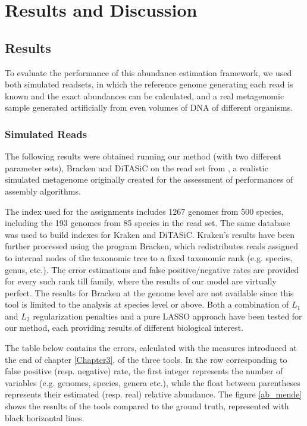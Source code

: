
\chapter{Results and Discussion}
\label{Chapter4}

\section{Results}

To evaluate the performance of this abundance estimation framework, we used both simulated readsets, in which the reference genome generating each read is known and the exact abundances can be calculated, and a real metagenomic sample generated artificially from even volumes of DNA of different organisms.

\subsection{Simulated Reads}
\label{mende_exp}

The following results were obtained running our method (with two different parameter sets), Bracken and DiTASiC on the read set from \cite{mende_assessment_2012}, a realistic simulated metagenome originally created for the assessment of performances of assembly algorithms.

The index used for the assignments includes 1267 genomes from 500 species, including the 193 genomes from 85 species in the read set. The same database was used to build indexes for Kraken and DiTASiC. Kraken's results have been further processed using the program Bracken, which redistributes reads assigned to internal nodes of the taxonomic tree to a fixed taxonomic rank (e.g. species, genus, etc.). The error estimations and false positive/negative rates are provided for every such rank till family, where the results of our model are virtually perfect. The results for Bracken at the genome level are not available since this tool is limited to the analysis at species level or above. Both a combination of $L_1$ and $L_2$ regularization penalties and a pure LASSO approach have been tested for our method, each providing results of different biological interest.

The table below contains the errors, calculated with the measures introduced at the end of chapter \ref{Chapter3}, of the three tools. In the row corresponding to false positive (resp. negative) rate, the first integer represents the number of variables (e.g. genomes, species, genera etc.), while the float between parentheses represents their estimated (resp. real) relative abundance. The figure \ref{ab_mende} shows the results of the tools compared to the ground truth, represented with black horizontal lines.

